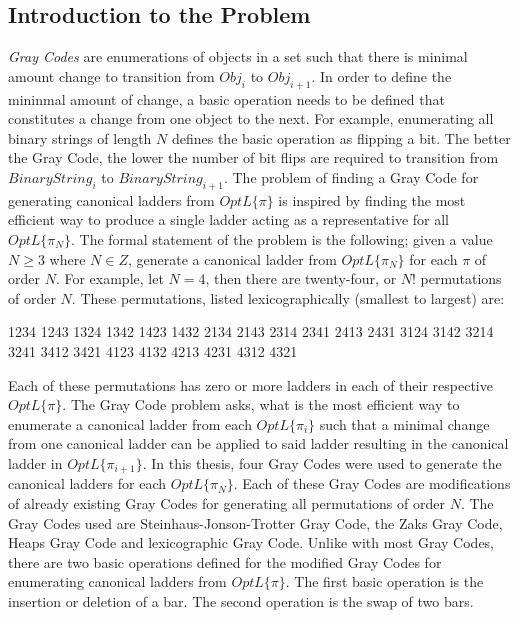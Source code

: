 
\subsection{Introduction to the Problem}
\emph{Gray Codes} are enumerations of objects in a set such that there is 
minimal amount change to transition from $Obj_{i}$ to $Obj_{i+1}$. In order 
to define the mininmal amount of change, a basic operation needs to be defined that constitutes a change
from one object to the next. For example, enumerating all binary strings of length $N$ defines the basic 
operation as flipping a bit. The better the Gray Code, the lower the number of 
bit flips are required to transition from $BinaryString_{i}$ to $BinaryString_{i+1}$. 
The problem of finding a Gray Code for generating canonical ladders from $OptL\{\pi\}$ is inspired by finding the most efficient way to produce a 
single ladder acting as a  representative for all $OptL\{\pi_{N}\}$. The formal statement of the problem is the following; given a value 
$N\geq3$ where $N \in Z$, generate a canonical ladder from $OptL\{\pi_{N}\}$ for each $\pi$ of order $N$.
For example, let $N=4$, then there are twenty-four, or $N!$ permutations 
of order $N$. These permutations, listed lexicographically (smallest to largest)
are:

\begin{center}
\small{1234 1243}\newline
\small{1324 1342}\newline
\small{1423 1432}\newline
\small{2134 2143}\newline
\small{2314 2341}\newline
\small{2413 2431}\newline
\small{3124 3142}\newline
\small{3214 3241}\newline
\small{3412 3421}\newline
\small{4123 4132}\newline
\small{4213 4231}\newline
\small{4312 4321}\newline
\end{center}
Each of these permutations has zero or more ladders in each of their respective 
$OptL\{\pi\}$. The Gray Code problem asks, what is the most efficient way to enumerate 
a canonical ladder from each $OptL\{\pi_{i}\}$ such that a minimal change from 
one canonical ladder can be applied to said ladder resulting in the canonical 
ladder in $OptL\{\pi_{i+1}\}$. In this thesis, four Gray Codes were used to generate the canonical 
ladders for each $OptL\{\pi_{N}\}$. Each of these Gray Codes are modifications of already existing 
Gray Codes for generating all permutations of order $N$. The Gray Codes used 
are Steinhaus-Jonson-Trotter Gray Code, the Zaks Gray Code, Heaps Gray Code and lexicographic Gray Code.
Unlike with most Gray Codes, there are two basic operations defined for 
the modified Gray Codes for enumerating canonical ladders from $OptL\{\pi\}$.
The first basic operation is the insertion or deletion of a bar. The second 
operation is the swap of two bars. 

